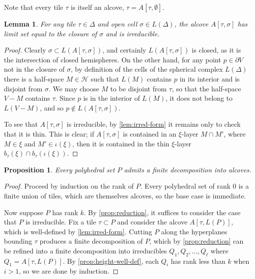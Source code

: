 \documentclass[11pt]{amsart}
\newtheorem{prop}[theorem]{Proposition}
\newtheorem{lemma}[theorem]{Lemma}
\numberwithin{table}{section}
\numberwithin{figure}{section}
\theoremstyle{remark}
\begin{document}
Note that every tile $\tau$ is itself an alcove, $\tau = A[\tau,
\emptyset]$. 

\begin{lemma} \label{lem:alcove-basics} For any tile $\tau \in \Delta$
  and open cell $\sigma\in L(\Delta)$, the alcove $A[\tau, \sigma]$
  has limit set equal to the closure of $\sigma$ and is irreducible.
\end{lemma}
\begin{proof}
  Clearly $\sigma \subset L(A[\tau,\sigma])$, and certainly
  $L(A[\tau, \sigma])$ is closed, as it is the intersection of closed
  hemispheres. On the other hand, for any point $p\in \partial V$ not
  in the closure of $\sigma$, by definition of the cells of the
  spherical complex $L(\Delta)$ there is a half-space $M\in \mathcal{H}$
  such that $L(M)$ contains $p$ in its interior and is disjoint from
  $\sigma$. We may choose $M$ to be disjoint from $\tau$, so that the
  half-space $V-M$ contains $\tau$. Since $p$ is in the interior of
  $L(M)$, it does not belong to $L(V-M)$, and so $p\notin
  L(A[\tau,\sigma])$.

  To see that $A[\tau, \sigma]$ is irreducible, by
  \cref{lem:irred-form} it remains only to check that it is thin. This
  is clear; if $A[\tau, \sigma]$ is contained in an $\xi$-layer
  $M\cap M'$, where $M\in \xi$ and $M'\in \iota(\xi)$, then it is
  contained in the thin $\xi$-layer
  $b_\tau(\xi) \cap b_\tau(\iota(\xi))$.
\end{proof}

\begin{prop} \label{lpropem:alcove-decomp}
  Every polyhedral set $P$ admits a finite decomposition into alcoves.
\end{prop}
\begin{proof}
  Proceed by induction on the rank of $P$. Every polyhedral set of
  rank 0 is a finite union of tiles, which are themselves alcoves, so
  the base case is immediate.

  Now suppose $P$ has rank $k$. By \cref{prop:reduction}, it suffices
  to consider the case that $P$ is irreducible. Fix a tile
  $\tau \subset P$ and consider the alcove $A[\tau, L(P)]$, which is
  well-defined by \cref{lem:irred-form}. Cutting $P$ along the
  hyperplanes bounding $\tau$ produces a finite decomposition of $P$,
  which by \cref{prop:reduction} can be refined into a finite
  decomposition into irreducibles $Q_1, Q_2,\dotsc, Q_\ell$ where
  $Q_1 = A[\tau, L(P)]$. By \cref{prop:height-well-def}, each $Q_i$ has
  rank less than $k$ when $i>1$, so we are done by induction.
\end{proof}
\end{document}
